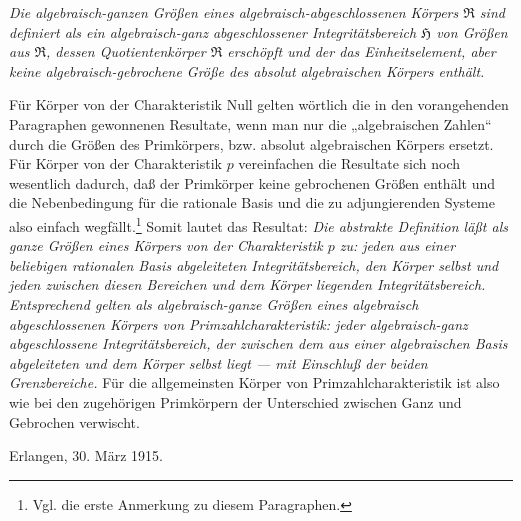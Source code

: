 \documentclass[11pt]{article}
\begin{document}
\emph{Die algebraisch-ganzen Größen eines algebraisch-abgeschlossenen Körpers
$\mathfrak R$ sind definiert als ein algebraisch-ganz abgeschlossener
Integritätsbereich $\mathfrak H$ von Größen aus $\mathfrak R$, dessen
Quotientenkörper $\mathfrak R$ erschöpft und der das Einheitselement, aber keine
algebraisch-gebrochene Größe des absolut algebraischen Körpers enthält.}

Für Körper von der Charakteristik Null gelten wörtlich die in den vorangehenden
Paragraphen gewonnenen Resultate, wenn man nur die „algebraischen Zahlen“ durch
die Größen des Primkörpers, bzw. absolut algebraischen Körpers ersetzt. Für
Körper von der Charakteristik $p$ vereinfachen die Resultate sich noch
wesentlich dadurch, daß der Primkörper keine gebrochenen Größen enthält und die
Nebenbedingung für die rationale Basis und die zu adjungierenden Systeme also
einfach wegfällt.\footnote{Vgl. die erste Anmerkung zu diesem Paragraphen.}
Somit lautet das Resultat: \emph{Die abstrakte Definition läßt als ganze Größen
eines Körpers von der Charakteristik $p$ zu: jeden aus einer beliebigen
rationalen Basis abgeleiteten Integritätsbereich, den Körper selbst und jeden
zwischen diesen Bereichen und dem Körper liegenden Integritätsbereich.
Entsprechend gelten als algebraisch-ganze Größen eines algebraisch
abgeschlossenen Körpers von Primzahlcharakteristik: jeder algebraisch-ganz
abgeschlossene Integritätsbereich, der zwischen dem aus einer algebraischen Basis
abgeleiteten und dem Körper selbst liegt --- mit Einschluß der beiden
Grenzbereiche.} Für die allgemeinsten Körper von Primzahlcharakteristik ist also
wie bei den zugehörigen Primkörpern der Unterschied zwischen Ganz und Gebrochen
verwischt.

\medskip
\noindent Erlangen, 30. März 1915.
\end{document}
